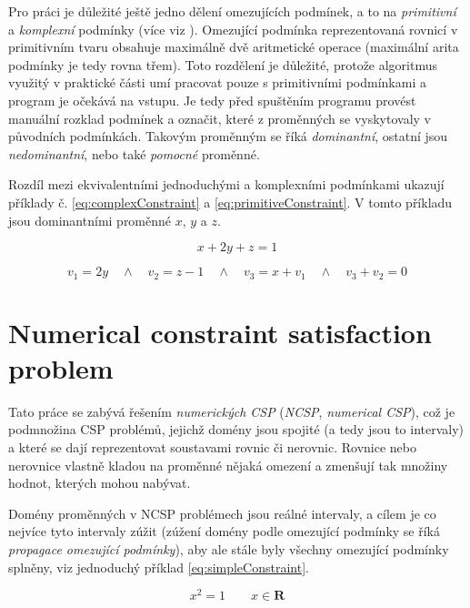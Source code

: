 Pro práci je důležité ještě jedno dělení omezujících podmínek, a to na \emph{primitivní} a \emph{komplexní} podmínky (více viz \cite{kue12}). Omezující podmínka reprezentovaná rovnicí v primitivním tvaru obsahuje maximálně dvě aritmetické operace (maximální arita podmínky je tedy rovna třem). Toto rozdělení je důležité, protože algoritmus využitý v praktické části umí pracovat pouze s primitivními podmínkami a program je očekává na vstupu. Je tedy před spuštěním programu provést manuální rozklad podmínek a označit, které z proměnných se vyskytovaly v původních podmínkách. Takovým proměnným se říká \emph{dominantní}, ostatní jsou \emph{nedominantní}, nebo také \emph{pomocné} proměnné.

Rozdíl mezi ekvivalentními jednoduchými a komplexními podmínkami ukazují příklady č. \ref{eq:complexConstraint} a \ref{eq:primitiveConstraint}. V tomto příkladu jsou dominantními proměnné $x$, $y$ a $z$.

\begin{equation} \label{eq:complexConstraint}
x + 2y + z = 1
\end{equation}

\begin{equation} \label{eq:primitiveConstraint}
v_1 = 2y \quad \wedge \quad v_2 = z - 1 \quad \wedge \quad v_3 = x + v_1 \quad \wedge \quad v_3 + v_2 = 0
\end{equation}







\section{Numerical constraint satisfaction problem}

Tato práce se zabývá řešením \emph{numerických CSP} (\emph{NCSP}, \emph{numerical CSP}), což je podmnožina CSP problémů, jejichž domény jsou spojité (a tedy jsou to intervaly) a které se dají reprezentovat soustavami rovnic či nerovnic. Rovnice nebo nerovnice vlastně kladou na proměnné nějaká omezení a zmenšují tak množiny hodnot, kterých mohou nabývat.

Domény proměnných v NCSP problémech jsou reálné intervaly, a cílem je co nejvíce tyto intervaly zúžit (zúžení domény podle omezující podmínky se říká \emph{propagace omezující podmínky}), aby ale stále byly všechny omezující podmínky splněny, viz jednoduchý příklad \ref{eq:simpleConstraint}.

\begin{equation} \label{eq:simpleConstraint}
x^2 = 1\qquad x \in \boldsymbol{R}
\end{equation}

